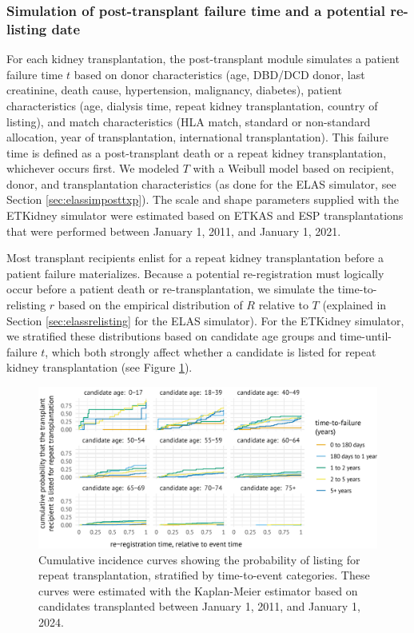 \documentclass[11pt,twoside,]{book}
\begin{document}
\subsubsection{Simulation of post-transplant failure time and a potential re-listing date}\label{sec:etkidneysimposttxp}

For each kidney transplantation, the post-transplant module simulates a
patient failure time \(t\) based on donor characteristics (age,
DBD/DCD donor, last creatinine, death cause, hypertension, malignancy, diabetes),
patient characteristics (age, dialysis time, repeat kidney
transplantation, country of listing), and match characteristics (HLA
match, standard or non-standard allocation, year of transplantation, international
transplantation). This failure time is defined as a post-transplant
death or a repeat kidney transplantation, whichever occurs first. We
modeled \(T\) with a Weibull model based on recipient, donor, and
transplantation characteristics (as done for the ELAS simulator, see Section \ref{sec:elassimposttxp}).
The scale and shape parameters supplied with
the ETKidney simulator were estimated based on ETKAS and ESP
transplantations that were performed between January 1, 2011, and January 1, 2021.

Most transplant recipients enlist for a repeat kidney transplantation
before a patient failure materializes. Because a
potential re-registration must logically occur before a patient death
or re-transplantation, we simulate the time-to-relisting \(r\) based on
the empirical distribution of \(R\) relative to \(T\) (explained in Section \ref{sec:elassrelisting} for the ELAS simulator).
For the ETKidney simulator, we stratified these distributions based on
candidate age groups and time-until-failure \(t\), which both strongly affect
whether a candidate is listed for repeat kidney transplantation
(see Figure \ref{fig:ch8sfig1}).

\begin{figure}[ht]

{\centering \includegraphics[width=1\linewidth]{figures/ch8//sFig1} 

}

\caption{Cumulative incidence curves showing the probability of listing for repeat transplantation, stratified by time-to-event categories. These curves were estimated with the Kaplan-Meier estimator based on candidates transplanted between January 1, 2011, and January 1, 2024.}\label{fig:ch8sfig1}
\end{figure}
\end{document}

